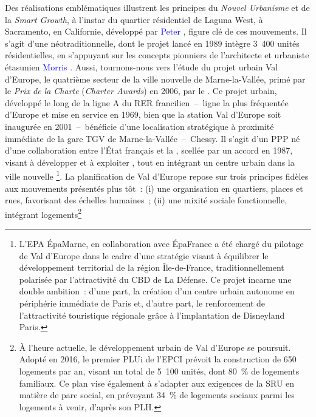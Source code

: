\begin{refsegment}
Des réalisations emblématiques illustrent les principes du \textsl{Nouvel Urbanisme} et de la \textsl{Smart Growth}, à l'instar du quartier résidentiel de Laguna West, à Sacramento, en Californie, développé par \textcolor{blue}{Peter} \textcolor{blue}{\textcite[146-149]{calthorpe_next_1993}}, figure clé de ces mouvements. Il s'agit d'une  néotraditionnelle, dont le projet lancé en 1989 intègre 3~400 unités résidentielles, en s'appuyant sur les concepts pionniers de l'architecte et urbaniste étasunien \textcolor{blue}{Morris} \textcolor{blue}{\textcite[]{newman_focus_1991-1}}. Aussi, tournons-nous vers l'étude du projet urbain Val d'Europe, le quatrième secteur de la ville nouvelle de Marne-la-Vallée, primé par le \textsl{Prix de la Charte} (\textsl{Charter Awards}) en 2006, par le \textcolor{blue}{\textcite{congress_for_the_new_urbanism_cnu_2006}}. Ce projet urbain, développé le long de la ligne A du \acrfull{RER} francilien~–~ligne la plus fréquentée d'Europe et mise en service en 1969, bien que la station Val d'Europe soit inaugurée en 2001~–~bénéficie d'une localisation stratégique à proximité immédiate de la gare \acrshort{TGV} de Marne-la-Vallée~–~Chessy. Il s'agit d'un \acrfull{PPP} né d'une collaboration entre l'État français et la , scellée par un accord en 1987, visant à développer et à exploiter , tout en intégrant un centre urbain dans la ville nouvelle \textcolor{blue}{\autocite{epamarne_val_nodate}}\footnote{
    L'\acrfull{EPA} ÉpaMarne, en collaboration avec ÉpaFrance a été chargé du pilotage de Val d'Europe dans le cadre d'une stratégie visant à équilibrer le développement territorial de la région Île-de-France, traditionnellement polarisée par l'attractivité du \acrfull{CBD} de La Défense. Ce projet incarne une double ambition~: d'une part, la création d'un centre urbain autonome en périphérie immédiate de Paris et, d'autre part, le renforcement de l'attractivité touristique régionale grâce à l'implantation de Disneyland Paris.
}. La planification de Val d'Europe repose sur trois principes fidèles aux mouvements présentés plus tôt~: (i) une organisation en quartiers, places et rues, favorisant des échelles humaines~; (ii) une mixité sociale fonctionnelle, intégrant logements\footnote{
    À l'heure actuelle, le développement urbain de Val d'Europe se poursuit. Adopté en 2016, le premier \acrfull{PLUi} de l'\acrshort{EPCI} prévoit la construction de 650 logements par an, visant un total de 5~100 unités, dont 80~\% de logements familiaux. Ce plan vise également à s'adapter aux exigences de la \acrfull{SRU} en matière de parc social, en prévoyant 34~\% de logements sociaux parmi les logements à venir, d'après son \acrfull{PLH}.
}
\end{refsegment}
